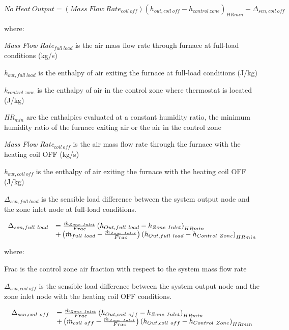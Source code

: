 \begin{equation}
No~Heat~Output = (Mass~Flow~Rat{e_{coil~off}}){({h_{out,coil~off}} - {h_{control~zone}})_{HRmin}} - {\Delta_{sen,coil~off}}
\end{equation}

where:

\emph{Mass Flow Rate\(_{full~load}\)} is the air mass flow rate through furnace at full-load conditions (kg/s)

\emph{h\(_{out,full~load}\)} is the enthalpy of air exiting the furnace at full-load conditions (J/kg)

\emph{h\(_{control~zone}\)} is the enthalpy of air in the control zone where thermostat is located (J/kg)

\emph{HR\(_{min}\)} are the enthalpies evaluated at a constant humidity ratio, the minimum humidity ratio of the furnace exiting air or the air in the control zone

\emph{Mass Flow Rate\(_{coil~off}\)} is the air mass flow rate through the furnace with the heating coil OFF (kg/s)

\emph{h\(_{out,coil~off}\)} is the enthalpy of air exiting the furnace with the heating coil OFF (J/kg)

\(\Delta_{sen,full~load}\) is the sensible load difference between the system output node and the zone inlet node at full-load conditions.

\begin{equation}
  \begin{array}{rl}
    \Delta_{sen,full~load} &= \frac{\dot{m}_{Zone~Inlet}}{Frac} \left(h_{Out,full~load} - h_{Zone~Inlet}\right)_{HRmin} \\
                           &+ \left(\dot{m}_{full~load} - \frac{\dot{m}_{Zone~Inlet}}{Frac}\right) \left(h_{Out,full~load} - h_{Control~Zone}\right)_{HRmin}
  \end{array}
\end{equation}

where:

Frac is the control zone air fraction with respect to the system mass flow rate

\(\Delta_{sen,coil~off}\) is the sensible load difference between the system output node and the zone inlet node with the heating coil OFF conditions.

\begin{equation}
  \begin{array}{rl}
    \Delta_{sen,coil~off} &= \frac{\dot{m}_{Zone~Inlet}}{Frac} \left(h_{Out,coil~off} - h_{Zone~Inlet}\right)_{HRmin} \\
                           &+ \left(\dot{m}_{coil~off} - \frac{\dot{m}_{Zone~Inlet}}{Frac}\right) \left(h_{Out,coil~off} - h_{Control~Zone}\right)_{HRmin}
  \end{array}
\end{equation}

